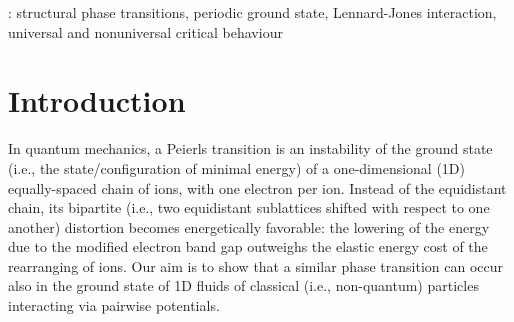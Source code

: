 \documentclass[12pt]{iopart}
\theoremstyle{definition}
\begin{document}
\vspace{2pc}
: structural phase transitions, periodic
ground state, Lennard-Jones interaction, universal and nonuniversal
critical behaviour


\maketitle

\renewcommand{\theequation}{1.\arabic{equation}}
\setcounter{equation}{0}

\section{Introduction} \label{Sec1}
In quantum mechanics, a Peierls transition \cite{Peierls91} is an instability
of the ground state (i.e., the state/configuration of minimal energy)
of a one-dimensional (1D) equally-spaced chain of ions,
with one electron per ion.
Instead of the equidistant chain, its bipartite (i.e., two equidistant
sublattices shifted with respect to one another) distortion becomes
energetically favorable: the lowering of the energy due to the modified
electron band gap outweighs the elastic energy cost of the rearranging of ions.
Our aim is to show that a similar phase transition can occur also in
the ground state of 1D fluids of classical (i.e., non-quantum) particles
interacting via pairwise potentials.  
\end{document}
